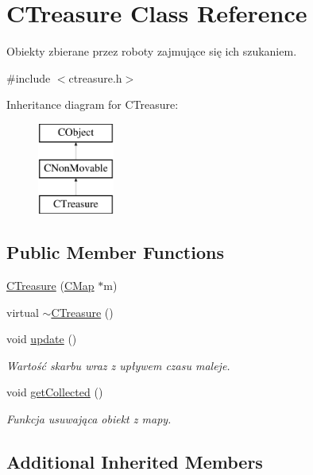 \hypertarget{class_c_treasure}{}\section{C\+Treasure Class Reference}
\label{class_c_treasure}


Obiekty zbierane przez roboty zajmujące się ich szukaniem.  




{\ttfamily \#include $<$ctreasure.\+h$>$}

Inheritance diagram for C\+Treasure\+:\begin{figure}[H]
\begin{center}
\leavevmode
\includegraphics[height=3.000000cm]{class_c_treasure}
\end{center}
\end{figure}
\subsection*{Public Member Functions}
\begin{DoxyCompactItemize}
\item 
\mbox{\hyperlink{class_c_treasure_aeb12f1d0197b6be908d30c5a36596a17}{C\+Treasure}} (\mbox{\hyperlink{class_c_map}{C\+Map}} $\ast$m)
\item 
virtual \mbox{\hyperlink{class_c_treasure_ad8197def05d5e5583f71a9d5e4ed8161}{$\sim$\+C\+Treasure}} ()
\item 
void \mbox{\hyperlink{class_c_treasure_a5030f2a7279aa608c40741f9e7040a90}{update}} ()
\begin{DoxyCompactList}\small\item\em Wartość skarbu wraz z upływem czasu maleje. \end{DoxyCompactList}\item 
void \mbox{\hyperlink{class_c_treasure_a00a58d2aea1c7844e502c8bcb3576678}{get\+Collected}} ()
\begin{DoxyCompactList}\small\item\em Funkcja usuwająca obiekt z mapy. \end{DoxyCompactList}\end{DoxyCompactItemize}
\subsection*{Additional Inherited Members}


